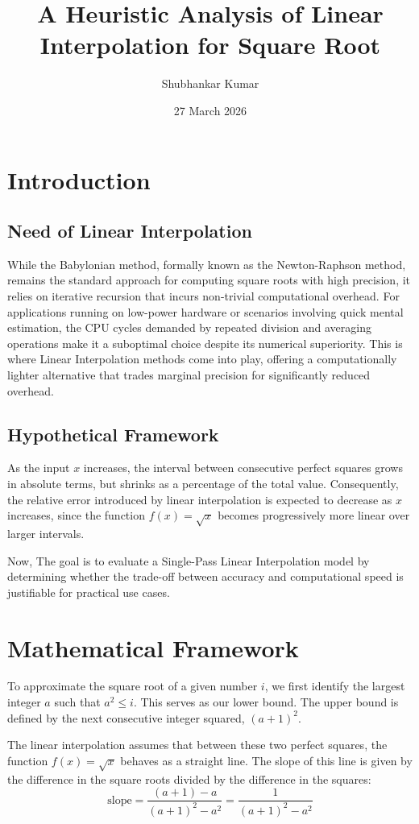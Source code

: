 \documentclass{article}
\title{A Heuristic Analysis of Linear Interpolation for Square Root}
\author{Shubhankar Kumar}
\date{27 March 2026}
\begin{document}
\maketitle

\section{Introduction}
\subsection{Need of Linear Interpolation}
While the Babylonian method, formally known as the Newton-Raphson method, remains 
the standard approach for computing square roots with high precision, it relies on 
iterative recursion that incurs non-trivial computational overhead. For applications 
running on low-power hardware or scenarios involving quick mental estimation, the 
CPU cycles demanded by repeated division and averaging operations make it a 
suboptimal choice despite its numerical superiority. This is where Linear Interpolation methods come into play, offering a computationally 
lighter alternative that trades marginal precision for significantly reduced overhead.
\subsection{Hypothetical Framework}
As the input $x$ increases, the interval between consecutive perfect squares 
grows in absolute terms, but shrinks as a percentage of the total value. 
Consequently, the relative error introduced by linear interpolation is expected 
to decrease as $x$ increases, since the function $f(x) = \sqrt{x}$ becomes 
progressively more linear over larger intervals.

Now, The goal is to evaluate a Single-Pass Linear Interpolation model by determining 
whether the trade-off between accuracy and computational speed is justifiable 
for practical use cases.
\section{Mathematical Framework}
To approximate the square root of a given number $i$, we first identify the largest integer $a$ such that $a^2 \le i$. This serves as our lower bound. The upper bound is defined by the next consecutive integer squared, $(a+1)^2$.

The linear interpolation assumes that between these two perfect squares, the function $f(x) = \sqrt{x}$ behaves as a straight line. The slope of this line is given by the difference in the square roots divided by the difference in the squares:
\begin{equation}
    \text{slope} = \frac{(a+1) - a}{(a+1)^2 - a^2} = \frac{1}{(a+1)^2 - a^2}
\end{equation}
\end{document}
